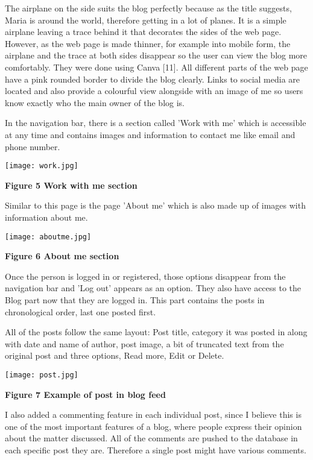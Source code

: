\documentclass[10pt, a4paper]{article}
\begin{document}
    The airplane on the side suits the blog perfectly because as the title suggests, Maria is around the world, therefore getting in a lot of planes. It is a simple airplane leaving a trace behind it that decorates the sides of the web page. However, as the web page is made thinner, for example into mobile form, the airplane and the trace at both sides disappear so the user can view the blog more comfortably. They were done using Canva [11].
    All different parts of the web page have a pink rounded border to divide the blog clearly. Links to social media are located and also provide a colourful view alongside with an image of me so users know exactly who the main owner of the blog is.

    In the navigation bar, there is a section called 'Work with me' which is accessible at any time and contains images and information to contact me like email and phone number.

    \texttt{[image: work.jpg]}

    \textbf{Figure 5 Work with me section}
    \vspace{2mm}

    Similar to this page is the page 'About me' which is also made up of images with information about me.

    \texttt{[image: aboutme.jpg]}

    \textbf{Figure 6 About me section}
    \vspace{2mm}

    Once the person is logged in or registered, those options disappear from the navigation bar and 'Log out' appears as an option.
    They also have access to the Blog part now that they are logged in. This part contains the posts in chronological order, last one posted first.

    All of the posts follow the same layout: Post title, category it was posted in along with date and name of author, post image, a bit of truncated text from the original post and three options, Read more, Edit or Delete.

    \texttt{[image: post.jpg]}

    \textbf{Figure 7 Example of post in blog feed}
    \vspace{2mm}

    I also added a commenting feature in each individual post, since I believe this is one of the most important features of a blog, where people express their opinion about the matter discussed.
    All of the comments are pushed to the database in each specific post they are. Therefore a single post might have various comments.
\end{document}
